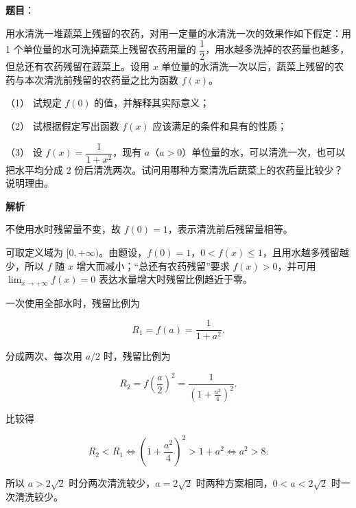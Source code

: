 \begin{answer}

\textbf{题目}：

用水清洗一堆蔬菜上残留的农药，对用一定量的水清洗一次的效果作如下假定：用 1 个单位量的水可洗掉蔬菜上残留农药用量的 $\dfrac12$，用水越多洗掉的农药量也越多，但总还有农药残留在蔬菜上。设用 $x$ 单位量的水清洗一次以后，蔬菜上残留的农药与本次清洗前残留的农药量之比为函数 $f(x)$。

（1） 试规定 $f(0)$ 的值，并解释其实际意义；

（2） 试根据假定写出函数 $f(x)$ 应该满足的条件和具有的性质；

（3） 设 $f(x)=\dfrac1{1+x^2}$，现有 $a$（$a>0$）单位量的水，可以清洗一次，也可以把水平均分成 2 份后清洗两次。试问用哪种方案清洗后蔬菜上的农药量比较少？说明理由。

\textbf{解析}


不使用水时残留量不变，故 $f(0)=1$，表示清洗前后残留量相等。


可取定义域为 $[0,+\infty)$。由题设，$f(0)=1$，$0<f(x)\le1$，且用水越多残留越少，所以 $f$ 随 $x$ 增大而减小；“总还有农药残留”要求 $f(x)>0$，并可用 $\lim_{x\to+\infty}f(x)=0$ 表达水量增大时残留比例趋近于零。


一次使用全部水时，残留比例为

\nopagebreak[4]
\[
R_1=f(a)=\frac1{1+a^2}.
\]

分成两次、每次用 $a/2$ 时，残留比例为

\nopagebreak[4]
\[
R_2=f\left(\frac a2\right)^2
=\frac1{\left(1+\frac{a^2}{4}\right)^2}.
\]

比较得

\nopagebreak[4]
\[
R_2<R_1
\Longleftrightarrow
\left(1+\frac{a^2}{4}\right)^2>1+a^2
\Longleftrightarrow a^2>8.
\]

所以 $a>2\sqrt2$ 时分两次清洗较少，$a=2\sqrt2$ 时两种方案相同，$0<a<2\sqrt2$ 时一次清洗较少。


\gkanswer{答案（2）：可取定义域 $[0,+\infty)$；$f(0)=1$，$0<f(x)\le1$，且 $f$ 随 $x$ 增大而减小，通常还应有 $\displaystyle\lim_{x\to+\infty}f(x)=0$。}


\end{answer}
